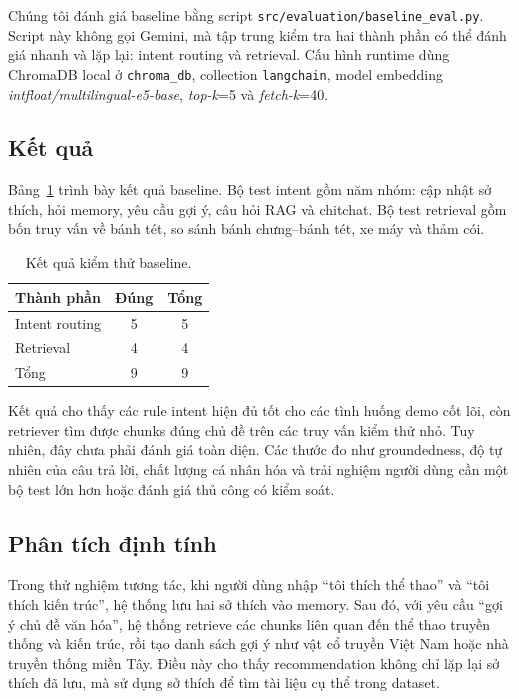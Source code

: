\documentclass[11pt]{article}
\begin{document}
Chúng tôi đánh giá baseline bằng script \texttt{src/evaluation/baseline\_eval.py}. Script này không gọi Gemini, mà tập trung kiểm tra hai thành phần có thể đánh giá nhanh và lặp lại: intent routing và retrieval. Cấu hình runtime dùng ChromaDB local ở \texttt{chroma\_db}, collection \texttt{langchain}, model embedding \textit{intfloat/multilingual-e5-base}, \textit{top-k}=5 và \textit{fetch-k}=40.

\subsection{Kết quả}

Bảng~\ref{tab:eval} trình bày kết quả baseline. Bộ test intent gồm năm nhóm: cập nhật sở thích, hỏi memory, yêu cầu gợi ý, câu hỏi RAG và chitchat. Bộ test retrieval gồm bốn truy vấn về bánh tét, so sánh bánh chưng--bánh tét, xe máy và thảm cói.

\begin{table}[t]
\centering
\small
\begin{tabular}{lcc}
\toprule
\textbf{Thành phần} & \textbf{Đúng} & \textbf{Tổng} \\
\midrule
Intent routing & 5 & 5 \\
Retrieval & 4 & 4 \\
\midrule
Tổng & 9 & 9 \\
\bottomrule
\end{tabular}
\caption{Kết quả kiểm thử baseline.}
\label{tab:eval}
\end{table}

Kết quả cho thấy các rule intent hiện đủ tốt cho các tình huống demo cốt lõi, còn retriever tìm được chunks đúng chủ đề trên các truy vấn kiểm thử nhỏ. Tuy nhiên, đây chưa phải đánh giá toàn diện. Các thước đo như groundedness, độ tự nhiên của câu trả lời, chất lượng cá nhân hóa và trải nghiệm người dùng cần một bộ test lớn hơn hoặc đánh giá thủ công có kiểm soát.

\subsection{Phân tích định tính}

Trong thử nghiệm tương tác, khi người dùng nhập ``tôi thích thể thao'' và ``tôi thích kiến trúc'', hệ thống lưu hai sở thích vào memory. Sau đó, với yêu cầu ``gợi ý chủ đề văn hóa'', hệ thống retrieve các chunks liên quan đến thể thao truyền thống và kiến trúc, rồi tạo danh sách gợi ý như vật cổ truyền Việt Nam hoặc nhà truyền thống miền Tây. Điều này cho thấy recommendation không chỉ lặp lại sở thích đã lưu, mà sử dụng sở thích để tìm tài liệu cụ thể trong dataset.
\end{document}
